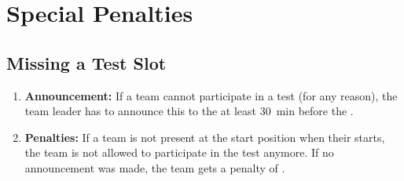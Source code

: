 \newcommand{\penaltybig}{500~}
\newcommand{\penaltysmall}{250~}


\section{Special Penalties}
\label{sec:rules:penaltiesbonuses}

\subsection{Missing a Test Slot}
\label{sec:rules:missingslot}
\begin{enumerate}
	\item \textbf{Announcement:} If a team cannot participate in a test (for any reason), the team leader has to announce this to the  at least \SI{30}{\minute} before the \Testblock{}.

	\item \textbf{Penalties:} If a team is not present at the start position when their \Testslot{} starts, the team is not allowed to participate in the test anymore. If no announcement was made, the team gets a penalty of \scoring{\penaltysmall points}.
\end{enumerate}

